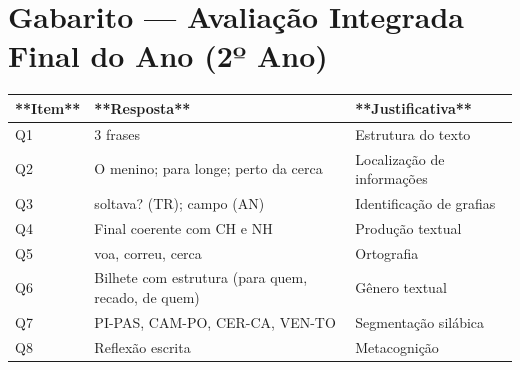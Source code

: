 \section{Gabarito --- Avaliação Integrada Final do Ano (2º Ano)}

\begin{center}
\renewcommand{\arraystretch}{1.5}
\begin{tabular}{lll}
\toprule
**Item** & **Resposta** & **Justificativa** \\
\midrule

Q1 & 3 frases & Estrutura do texto \\

Q2 & O menino; para longe; perto da cerca & Localização de informações \\

Q3 & soltava? (TR); campo (AN) & Identificação de grafias \\

Q4 & Final coerente com CH e NH & Produção textual \\

Q5 & voa, correu, cerca & Ortografia \\

Q6 & Bilhete com estrutura (para quem, recado, de quem) & Gênero textual \\

Q7 & PI-PAS, CAM-PO, CER-CA, VEN-TO & Segmentação silábica \\

Q8 & Reflexão escrita & Metacognição \\

\bottomrule
\end{tabular}
\end{center}
